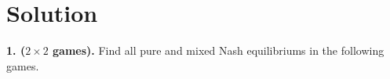 \documentclass{article}
\begin{document}
\setlength{\parindent}{0pt}

\section*{Solution}

\textbf{1. (\(2\times 2\) games).}
Find all pure and mixed Nash equilibriums in the following games.







\end{document}
